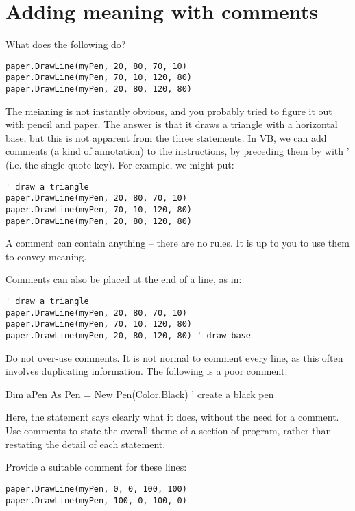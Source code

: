 	\section{Adding meaning with comments}
		What does the following do?
		\begin{lstlisting}
paper.DrawLine(myPen, 20, 80, 70, 10)
paper.DrawLine(myPen, 70, 10, 120, 80)
paper.DrawLine(myPen, 20, 80, 120, 80)
		\end{lstlisting}

		The meianing is not instantly obvious, and you probably tried to figure it out with pencil and paper. The answer is that it draws a triangle with a horizontal base, but this is not apparent from the three statements. In VB, we can add comments (a kind of annotation) to the instructions, by preceding them by with ' (i.e. the single-quote key). For example, we might put:
		\begin{lstlisting}
' draw a triangle
paper.DrawLine(myPen, 20, 80, 70, 10)
paper.DrawLine(myPen, 70, 10, 120, 80)
paper.DrawLine(myPen, 20, 80, 120, 80)
		\end{lstlisting}

		A comment can contain anything – there are no rules. It is up to you to use them to convey meaning.
		
		Comments can also be placed at the end of a line, as in:
		\begin{lstlisting}
' draw a triangle
paper.DrawLine(myPen, 20, 80, 70, 10)
paper.DrawLine(myPen, 70, 10, 120, 80)
paper.DrawLine(myPen, 20, 80, 120, 80) ' draw base
		\end{lstlisting}

		Do not over-use comments. It is not normal to comment every line, as this often involves duplicating information. The following is a poor comment:

Dim aPen As Pen = New Pen(Color.Black) ' create a black pen
	
		Here, the statement says clearly what it does, without the need for a comment. Use comments to state the overall theme of a section of program, rather than restating the detail of each statement.
		
		\begin{stqb}
			\begin{STQ}
			\item	Provide a suitable comment for these lines:
		\begin{lstlisting}
paper.DrawLine(myPen, 0, 0, 100, 100)
paper.DrawLine(myPen, 100, 0, 100, 0)
\end{lstlisting}		
			\end{STQ}
		\end{stqb}

